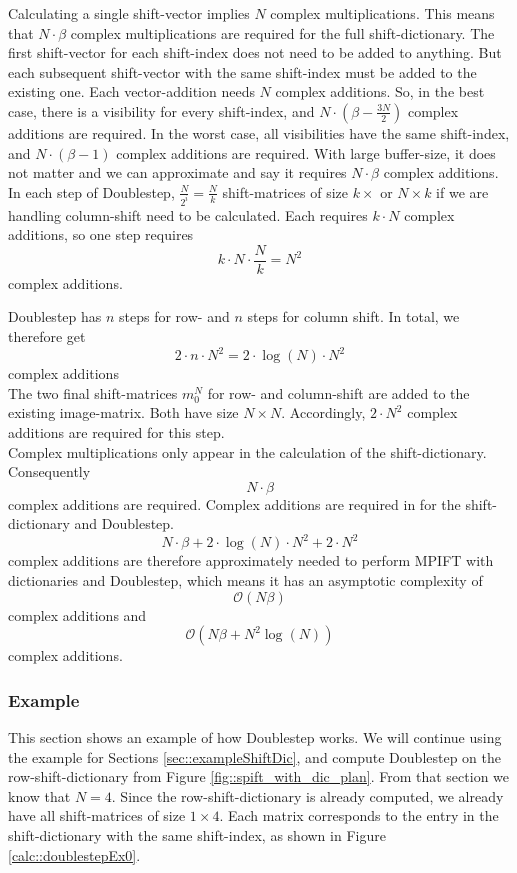 \documentclass[12pt]{article}
\begin{document}
Calculating a single shift-vector implies $N$ complex multiplications. This means that $N\cdot \beta$ complex multiplications are required for the full shift-dictionary. The first shift-vector for each shift-index does not need to be added to anything. But each subsequent shift-vector with the same shift-index must be added to the existing one. Each vector-addition needs $N$ complex additions. So, in the best case, there is a visibility for every shift-index, and $N\cdot (\beta - \frac{3N}{2})$ complex additions are required. In the worst case, all visibilities have the same shift-index, and $N\cdot (\beta - 1)$ complex additions are required. With large buffer-size, it does not matter and we can approximate and say it requires $N\cdot \beta$ complex additions. \\

In each step of Doublestep, $\frac{N}{2^i}=\frac{N}{k}$ shift-matrices of size $k\times$ or $N\times k$ if we are handling column-shift need to be calculated. Each requires $k\cdot N$ complex additions, so one step requires 
\[
k\cdot N\cdot \frac{N}{k}=N^2
\]
complex additions.

Doublestep has $n$ steps for row- and $n$ steps for column shift. In total, we therefore get
\[
2\cdot n\cdot N^2=2\cdot \log(N)\cdot N^2
\]
complex additions\\

The two final shift-matrices $m_0^N$ for row- and column-shift are added to the existing image-matrix. Both have size $N\times N$. Accordingly, $2\cdot N^2$ complex additions are required for this step.\\

Complex multiplications only appear in the calculation of the shift-dictionary. Consequently 
\[
N\cdot \beta
\] complex additions are required. Complex additions are required in for the shift-dictionary and Doublestep.
\[
N\cdot \beta + 2\cdot \log(N)\cdot N^2+2\cdot N^2
\] complex additions are therefore approximately needed to perform MPIFT with dictionaries and Doublestep, which means it has an asymptotic complexity of
\[
\mathcal{O}(N \beta)
\] complex additions and
\[
 \mathcal{O}({N \beta + N^2 \log(N)})
\]
complex additions.


\subsubsection{Example}
\label{sec::DS_example}

This section shows an example of how Doublestep works. We will continue using the example for Sections \ref{sec::exampleShiftDic}, and compute Doublestep on the row-shift-dictionary from Figure \ref{fig::spift_with_dic_plan}. From that section we know that $N=4$. Since the row-shift-dictionary is already computed, we already have all shift-matrices of size $1\times 4$. Each matrix corresponds to the entry in the shift-dictionary with the same shift-index, as shown in Figure \ref{calc::doublestepEx0}. 
\end{document}

